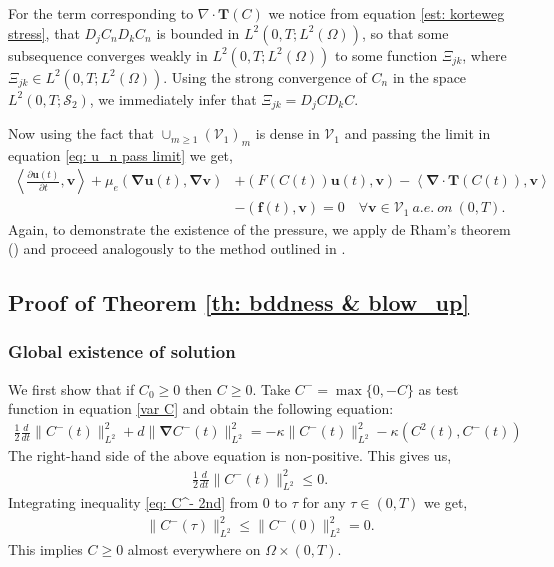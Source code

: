 \documentclass[final,3p,times]{elsarticle}
\theoremstyle{plain}
\theoremstyle{remark}
\theoremstyle{plain}
\theoremstyle{remark}
\begin{document}
For the term corresponding to $\nabla \cdot \mathbf{T}(C)$ we notice from equation \eqref{est: korteweg stress}, that $D_j C_n D_k C_n$ is bounded in $L^2(0, T; L^2(\Omega))$, so that some subsequence
converges weakly in $L^2(0, T; L^2(\Omega))$ to some function $\Xi_{jk}$, where $\Xi_{jk} \in L^2(0, T; L^2(\Omega))$. Using the strong convergence of $C_n$ in
the space $L^2(0, T; \mathscr S_2)$, we immediately infer that $\Xi_{jk} = D_j C D_k C$.

Now using the fact that $\cup_{m\ge1}\left(\mathscr V_1\right)_m$ is dense in $\mathscr V_1$ and passing the limit in equation \eqref{eq: u_n pass limit} we get,
\begin{align}
	\left \langle  \frac{\partial \mathbf{u}\left(t\right)}{\partial t},\mathbf{v} \right \rangle + \mu_e\left(\boldsymbol{\nabla} \mathbf{u}\left(t\right), \boldsymbol{\nabla} \mathbf{v}\right)
    & + \left(F\left(C\left(t\right)\right) \mathbf{u}\left(t\right),\mathbf{v}\right) -\left \langle \boldsymbol{\nabla} \cdot \mathbf{T}\left(C\left(t\right)\right) , \mathbf{v} \right \rangle \nonumber \\ 
    & - \left(\mathbf f\left(t\right),\mathbf v\right) = 0 \quad \forall \mathbf{v} \in \mathscr V_1\ a.e. \ on \ \left(0,T\right) \label{eq: existence u}.
\end{align}
Again, to demonstrate the existence of the pressure, we apply de Rham's theorem (\emph{\citep[Theorem IV.2.4]{boyer2012mathematical}}) and proceed analogously to the method outlined in \citep{kundu2024existence}.

\subsection{Proof of Theorem \ref{th: bddness & blow_up}}

\subsubsection{Global existence of solution}
We first show that if $C_0\geq0$ then $C\geq 0.$
Take $C^-=\max\{0,-C\}$ as test function in equation \eqref{var C} and obtain the following equation:
\begin{align}
    \frac{1}{2}\frac{d}{dt}\|C^-(t)\|_{L^2}^2+d\|\boldsymbol\nabla C^-(t)\|_{L^2}^2 =- \kappa \|C^-(t)\|_{L^2}^2-\kappa\left(C^2(t),C^-(t)\right)
\end{align}
The right-hand side of the above equation is non-positive. This gives us,
\begin{align}
     \frac{1}{2}\frac{d}{dt}\|C^-(t)\|_{L^2}^2\le 0. \label{eq: C^- 2nd}
\end{align}
Integrating inequality \eqref{eq: C^- 2nd} from $0$ to $\tau$ for any $\tau \in (0,T)$ we get,
\begin{align}
    \|C^-(\tau)\|_{L^2}^2\le \| C^-(0) \|_{L^2}^2 = 0. 
\end{align}
This implies $C\ge0$ almost everywhere on $\Omega\times(0,T)$.  
\end{document}
